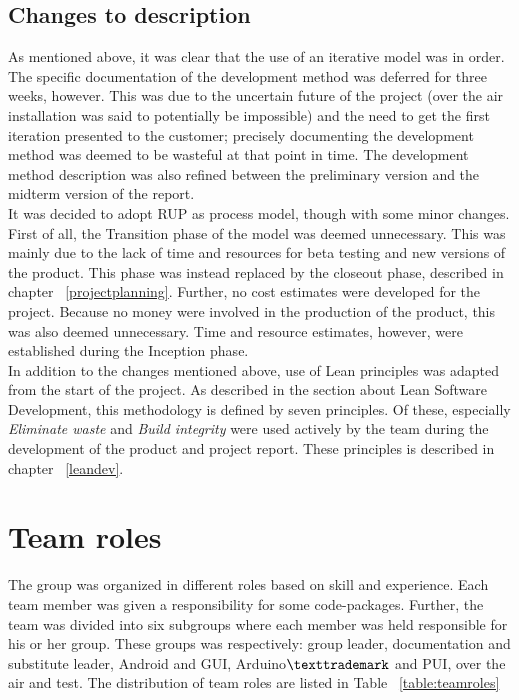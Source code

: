 \subsection{Changes to description}
As mentioned above, it was clear that the use of an iterative model was in order. The specific documentation of the development method was deferred for three weeks, however. This was due to the uncertain future of the project (over the air installation was said to potentially be impossible) and the need to get the first iteration presented to the customer; precisely documenting the development method was deemed to be wasteful at that point in time. The development method description was also refined between the preliminary version and the midterm version of the report. \\
\newline
It was decided to adopt RUP as process model, though with some minor changes. First of all, the Transition phase of the model was deemed unnecessary. This was mainly due to the lack of time and resources for beta testing and new versions of the product. This phase was instead replaced by the closeout phase, described in chapter ~\ref{projectplanning}. Further, no cost estimates were developed for the project. Because no money were involved in the production of the product, this was also deemed unnecessary. Time and resource estimates, however, were established during the Inception phase. \\
\newline
In addition to the changes mentioned above, use of Lean principles was adapted from the start of the project. As described in the section about Lean Software Development, this methodology is defined by seven principles. Of these, especially \emph{Eliminate waste} and \emph{Build integrity} were used actively by the team during the development of the product and project report. These principles is described in chapter ~\ref{leandev}.

\section{Team roles}
The group was organized in different roles based on skill and experience. Each team member was given a responsibility for some code-packages. Further, the team was divided into six subgroups where each member was held responsible for his or her group. These groups was respectively: group leader, documentation and substitute leader, Android and GUI, Arduino$\texttrademark$ and PUI, over the air and test.
The distribution of team roles are listed in Table ~\ref{table:teamroles}

